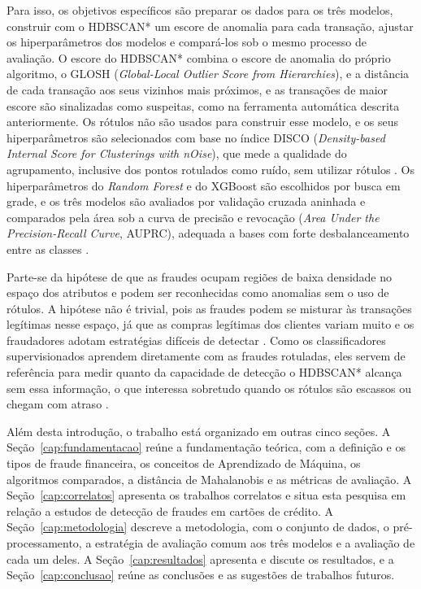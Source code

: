 \documentclass{uflamon}          %
\begin{document}
Para isso, os objetivos específicos são preparar os dados para os três modelos, construir com o HDBSCAN* um escore de anomalia para cada transação, ajustar os hiperparâmetros dos modelos e compará-los sob o mesmo processo de avaliação. O escore do HDBSCAN* combina o escore de anomalia do próprio algoritmo, o GLOSH (\textit{Global-Local Outlier Score from Hierarchies}), e a distância de cada transação aos seus vizinhos mais próximos, e as transações de maior escore são sinalizadas como suspeitas, como na ferramenta automática descrita anteriormente. Os rótulos não são usados para construir esse modelo, e os seus hiperparâmetros são selecionados com base no índice DISCO (\textit{Density-based Internal Score for Clusterings with nOise}), que mede a qualidade do agrupamento, inclusive dos pontos rotulados como ruído, sem utilizar rótulos \cite{beer2025}. Os hiperparâmetros do \textit{Random Forest} e do XGBoost são escolhidos por busca em grade, e os três modelos são avaliados por validação cruzada aninhada e comparados pela área sob a curva de precisão e revocação (\textit{Area Under the Precision-Recall Curve}, AUPRC), adequada a bases com forte desbalanceamento entre as classes \cite{davis2006}.

Parte-se da hipótese de que as fraudes ocupam regiões de baixa densidade no espaço dos atributos e podem ser reconhecidas como anomalias sem o uso de rótulos. A hipótese não é trivial, pois as fraudes podem se misturar às transações legítimas nesse espaço, já que as compras legítimas dos clientes variam muito e os fraudadores adotam estratégias difíceis de detectar \cite{jurgovsky2018}. Como os classificadores supervisionados aprendem diretamente com as fraudes rotuladas, eles servem de referência para medir quanto da capacidade de detecção o HDBSCAN* alcança sem essa informação, o que interessa sobretudo quando os rótulos são escassos ou chegam com atraso \cite{dalpozzolo2018}.

Além desta introdução, o trabalho está organizado em outras cinco seções. A Seção~\ref{cap:fundamentacao} reúne a fundamentação teórica, com a definição e os tipos de fraude financeira, os conceitos de Aprendizado de Máquina, os algoritmos comparados, a distância de Mahalanobis e as métricas de avaliação. A Seção~\ref{cap:correlatos} apresenta os trabalhos correlatos e situa esta pesquisa em relação a estudos de detecção de fraudes em cartões de crédito. A Seção~\ref{cap:metodologia} descreve a metodologia, com o conjunto de dados, o pré-processamento, a estratégia de avaliação comum aos três modelos e a avaliação de cada um deles. A Seção~\ref{cap:resultados} apresenta e discute os resultados, e a Seção~\ref{cap:conclusao} reúne as conclusões e as sugestões de trabalhos futuros.
\end{document}
